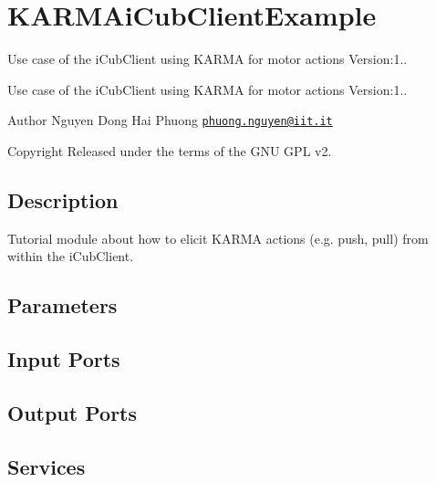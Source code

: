 \hypertarget{group__KARMAiCubClientExample}{}\section{K\+A\+R\+M\+Ai\+Cub\+Client\+Example}
\label{group__KARMAiCubClientExample}


Use case of the i\+Cub\+Client using K\+A\+R\+MA for motor actions Version\+:1..  


Use case of the i\+Cub\+Client using K\+A\+R\+MA for motor actions Version\+:1.. 

\begin{DoxyAuthor}{Author}
Nguyen Dong Hai Phuong \href{mailto:phuong.nguyen@iit.it}{\tt phuong.\+nguyen@iit.\+it} ~\newline
 
\end{DoxyAuthor}
\begin{DoxyCopyright}{Copyright}
Released under the terms of the G\+NU G\+PL v2. 
\end{DoxyCopyright}
\hypertarget{group__touchDetector_intro_sec}{}\subsection{Description}\label{group__touchDetector_intro_sec}
Tutorial module about how to elicit K\+A\+R\+MA actions (e.\+g. push, pull) from within the i\+Cub\+Client.\hypertarget{group__touchDetector_parameters_sec}{}\subsection{Parameters}\label{group__touchDetector_parameters_sec}
\hypertarget{group__touchDetector_inputports_sec}{}\subsection{Input Ports}\label{group__touchDetector_inputports_sec}
\hypertarget{group__touchDetector_outputports_sec}{}\subsection{Output Ports}\label{group__touchDetector_outputports_sec}
\hypertarget{group__touchDetector_services_sec}{}\subsection{Services}\label{group__touchDetector_services_sec}

